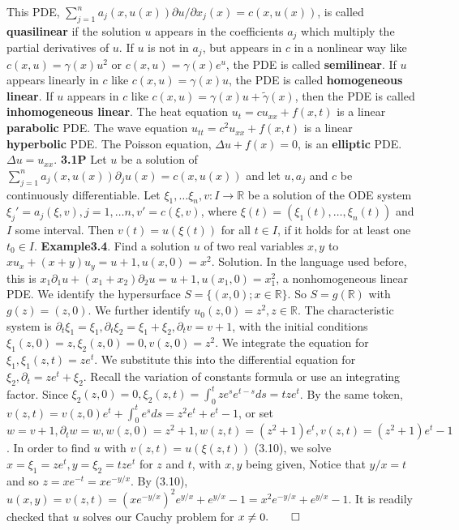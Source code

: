 \documentclass[6pt]{article}
\newcommand{\R}{\mathbb{R}}
\newcommand{\ra}{\rightarrow}
\begin{document}
\fontsize{8}{10}
\selectfont
\begin{multicols}{2}
This PDE, $\sum_{j=1}^n a_j(x,u(x))\partial u/\partial x_j(x)=c(x,u(x))$, is called {\bf quasilinear} if the solution $u$ appears in the coefficients $a_j$ which multiply the partial derivatives of $u$. 
If $u$ is not in $a_j$, but appears in $c$ in a nonlinear way like $c(x,u)=\gamma(x)u^2$ or $c(x,u)=\gamma(x)e^u$, the PDE is called {\bf semilinear}. If $u$ appears linearly in $c$ like $c(x,u)= \gamma(x)u$, the PDE is called {\bf homogeneous linear}.  If $u$ appears in $c$ like $c(x,u)=\gamma(x)u+\tilde{\gamma}(x)$, then the PDE is called {\bf inhomogeneous linear}. The heat equation $u_t=cu_{xx}+f(x,t)$ is a linear {\bf parabolic} PDE. The wave equation $u_{tt}=c^2 u_{xx}+f(x,t)$ is a linear {\bf hyperbolic} PDE. The Poisson equation, $\Delta u + f(x)=0$, is an {\bf elliptic} PDE. $\Delta u=u_{xx}$.
{\bf 3.1P} Let $u$ be a solution of $\sum_{j=1}^n a_j(x,u(x))\partial_ju(x)=c(x,u(x))$ and let $u, a_j$ and $c$ be continuously differentiable.  Let $\xi_1, \dots \xi_n, v: I\ra \R$ be a solution of the ODE system $\xi_j'=a_j(\xi,v), j=1, \dots n, v'=c(\xi,v)$, where $\xi(t)=(\xi_1(t), \dots, \xi_n(t))$ and $I$ some interval.  Then $v(t)=u(\xi(t))$ for all $t \in I$, if it holds for at least one $t_0 \in I$.
{\bf Example3.4}. Find a solution $u$ of two real variables $x,y$ to $xu_x+(x+y)u_y=u+1, u(x,0)=x^2$. Solution.  In the language used before, this is $x_1\partial_1u+(x_1+x_2)\partial_2u=u+1, u(x_1,0)=x_1^2$, a nonhomogeneous linear PDE.  We identify the hypersurface $S=\{(x,0); x \in \R\}$. So $S=g(\R)$ with $g(z)=(z,0)$. We further identify $u_0(z,0)=z^2, z\in \R$.  The characteristic system is $\partial_t\xi_1=\xi_1, \partial_t\xi_2=\xi_1+\xi_2, \partial_tv=v+1$, with the initial conditions $\xi_1(z,0)=z, \xi_2(z,0)=0, v(z,0)=z^2$. We integrate the equation for $\xi_1, \xi_1(z,t)=ze^t$. We substitute this into the differential equation for $\xi_2, \partial_t=ze^t+\xi_2$. Recall the variation of constants formula or use an integrating factor. Since $\xi_2(z,0)=0, \xi_2(z,t)=\int_0^t ze^se^{t-s}ds=tze^t$. By the same token, $v(z,t)=v(z,0)e^t+\int_0^te^sds=z^2e^t+e^t-1$, or set $w=v+1, \partial_t w=w, w(z,0)=z^2+1, w(z,t)=(z^2+1)e^t, v(z,t)=(z^2+1)e^t-1$. In order to find $u$ with $v(z,t)=u(\xi(z,t))$ (3.10), we solve $x=\xi_1=ze^t, y=\xi_2=tze^t$ for $z$ and $t$, with $x,y$ being given, Notice that $y/x = t$ and so $z=xe^{-t}=xe^{-y/x}$. By (3.10), $u(x,y)=v(z,t)=(xe^{-y/x})^2e^{y/x}+e^{y/x}-1=x^2e^{-y/x}+e^{y/x}-1$.  It is readily checked that $u$ solves our Cauchy problem for $x \neq 0. \qed$

\end{multicols}
\end{document}
